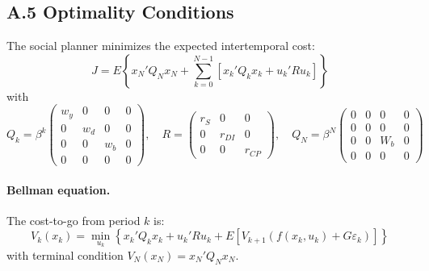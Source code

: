 \documentclass[12pt, a4paper]{article}
\begin{document}
\subsection*{A.5 Optimality Conditions}

The social planner minimizes the expected intertemporal cost:
%
\begin{equation}
    J = E\left\{x_N' Q_N x_N + \sum_{k=0}^{N-1} \left[x_k' Q_k x_k + u_k' R u_k\right]\right\}
    \label{eq:objective}
\end{equation}
%
with
%
\begin{equation}
    Q_k = \beta^k \begin{pmatrix} w_y & 0 & 0 & 0 \\ 0 & w_d & 0 & 0 \\ 0 & 0 & w_b & 0 \\ 0 & 0 & 0 & 0 \end{pmatrix}, \quad
    R = \begin{pmatrix} r_S & 0 & 0 \\ 0 & r_{DI} & 0 \\ 0 & 0 & r_{CP} \end{pmatrix}, \quad
    Q_N = \beta^N \begin{pmatrix} 0 & 0 & 0 & 0 \\ 0 & 0 & 0 & 0 \\ 0 & 0 & W_b & 0 \\ 0 & 0 & 0 & 0 \end{pmatrix}
    \label{eq:cost_matrices}
\end{equation}

\paragraph{Bellman equation.} The cost-to-go from period $k$ is:
%
\begin{equation}
    V_k(x_k) = \min_{u_k} \left\{x_k' Q_k x_k + u_k' R u_k + E\left[V_{k+1}(f(x_k, u_k) + G\varepsilon_k)\right]\right\}
    \label{eq:bellman}
\end{equation}
%
with terminal condition $V_N(x_N) = x_N' Q_N x_N$.
\end{document}
